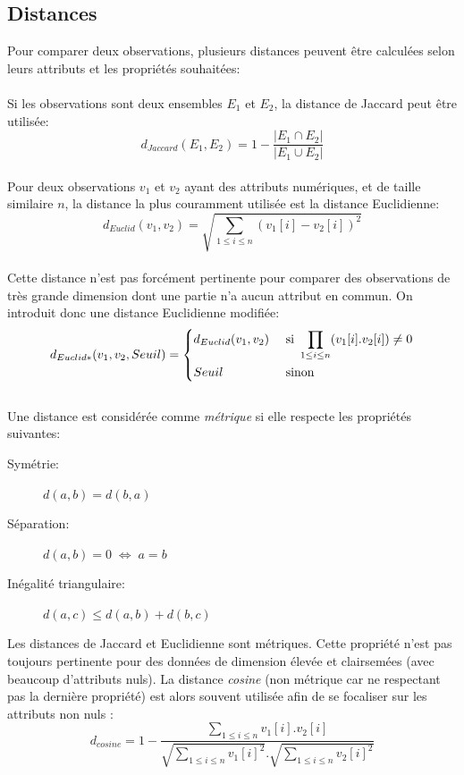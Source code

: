 \subsection{Distances}
Pour comparer deux observations, plusieurs distances \citep{gan2007data} peuvent être calculées selon leurs attributs et les propriétés souhaitées:\\
\\
Si les observations sont deux ensembles $E_{1}$ et $E_{2}$, la distance de Jaccard peut être utilisée: 
\begin{equation}
d_{Jaccard}(E_{1},E_{2})=1-\frac{|E_{1}\cap E_{2}|}{|E_{1}\cup E_{2}|}
\end{equation}
\\
Pour deux observations $v_{1}$ et $v_{2}$ ayant des attributs numériques, et de taille similaire $n$, la distance la plus couramment utilisée est la distance Euclidienne:
\begin{equation}
d_{Euclid}(v_{1},v_{2})=\sqrt{\sum_{1\leq i\leq n}{(v_{1}[i]-v_{2}[i])}^{2}}
\end{equation}
\\
Cette distance n'est pas forcément pertinente pour comparer des observations de très grande dimension dont une partie n'a aucun attribut en commun. On introduit donc une distance Euclidienne modifiée:
\begin{equation}\label{eqeuclidmodif}
d_{Euclid*}(v_{1},v_{2},Seuil)=
\begin{dcases} 
d_{Euclid}(v_{1},v_{2}) & \textrm{ si }\prod_{1\leq i\leq n}(v_{1}[i].v_{2}[i])\neq 0\\
Seuil & \textrm{ sinon}
\end{dcases}
\end{equation}
\\
Une distance est considérée comme \textit{métrique} si elle respecte les propriétés suivantes:
\begin{description}
\item[ Symétrie:] $d(a,b)=d(b,a)$
\item[ Séparation:] $d(a,b)=0 \;\Leftrightarrow \;a=b$
\item[ Inégalité triangulaire:] $d(a,c) \leqslant d(a,b)+d(b,c)$
\end{description}
Les distances de Jaccard et Euclidienne sont métriques. Cette propriété n'est pas toujours pertinente pour des données de dimension élevée et clairsemées (avec beaucoup d'attributs nuls). La distance \textit{cosine} (non métrique car ne respectant pas la dernière propriété) est alors souvent utilisée afin de se focaliser sur les attributs non nuls \citep{han2012data}:
\begin{equation}
d_{cosine}=1-\frac{\sum_{1\leq i\leq n}v_{1}[i].v_{2}[i]}{\sqrt{\sum_{1\leq i\leq n}{v_{1}[i]}^{2}}.\sqrt{\sum_{1\leq i\leq n}{v_{2}[i]}^{2}}}\label{eqcosine}
\end{equation}


